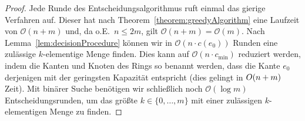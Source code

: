 \begin{proof}
    Jede Runde des Entscheidungsalgorithmus ruft einmal das gierige Verfahren auf.
    Dieser hat nach Theorem~\ref{theorem:greedyAlgorithm} eine Laufzeit von $\mathcal O(n+m)$ und, da o.E.\
    $n \leq 2m$, gilt $\mathcal O(n+m) = \mathcal O(m)$.
    Nach Lemma~\ref{lem:decisionProcedure} können wir in $\mathcal O(n \cdot c(e_0))$ Runden eine zulässige $k$-elementige Menge finden.
    Dies kann auf $\mathcal O(n \cdot c_{\min})$ reduziert werden, indem die Kanten und Knoten des Rings so benannt werden, dass
    die Kante $e_0$ derjenigen mit der geringsten Kapazität entspricht (dies gelingt in $\mathcal \mathcal O(n+m)$ Zeit).
    Mit binärer Suche benötigen wir schließlich noch $\mathcal O(\log m)$ Entscheidungsrunden, um das größte $k \in \{0, \dots, m\}$
    mit einer zulässigen $k$-elementigen Menge zu finden.
\end{proof}













